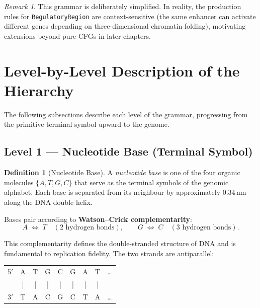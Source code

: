 \documentclass[12pt, a4paper, oneside]{book}
\theoremstyle{definition}
\newtheorem{definition}{Definition}[chapter]
\theoremstyle{remark}
\newtheorem{remark}{Remark}[chapter]
\newcommand{\NT}[1]{\textcolor{ntcolor}{\texttt{#1}}}   %
\begin{document}
\begin{remark}
This grammar is deliberately simplified.  In reality, the production rules
for \NT{RegulatoryRegion} are context-sensitive (the same enhancer can
activate different genes depending on three-dimensional chromatin folding),
motivating extensions beyond pure CFGs in later chapters.
\end{remark}

\section{Level-by-Level Description of the Hierarchy}
\label{sec:levels}

The following subsections describe each level of the grammar,
progressing from the primitive terminal symbol upward to the genome.

\subsection{Level 1 — Nucleotide Base (Terminal Symbol)}
\label{subsec:base}

\begin{definition}[Nucleotide Base]
A \emph{nucleotide base} is one of the four organic molecules
$\{A, T, G, C\}$ that serve as the terminal symbols of the genomic alphabet.
Each base is separated from its neighbour by approximately $0.34\,\text{nm}$
along the DNA double helix.
\end{definition}

Bases pair according to \textbf{Watson--Crick complementarity}:
\begin{equation}
  A \;\Longleftrightarrow\; T \quad (\text{2 hydrogen bonds}),
  \qquad
  G \;\Longleftrightarrow\; C \quad (\text{3 hydrogen bonds}).
\end{equation}

This complementarity defines the double-stranded structure of DNA and is
fundamental to replication fidelity.  The two strands are antiparallel:

\begin{center}
\ttfamily\small
\begin{tabular}{ccccccccc}
5$'$ & A & T & G & C & G & A & T & \ldots \\
     & | & | & | & | & | & | & | & \\
3$'$ & T & A & C & G & C & T & A & \ldots
\end{tabular}
\end{center}
\end{document}
